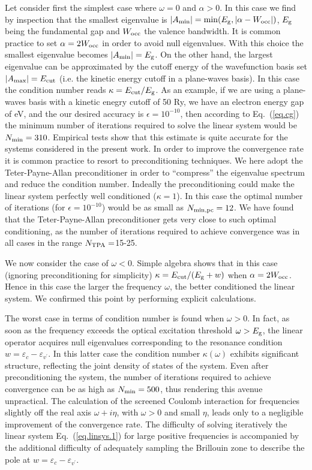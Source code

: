 \documentclass[twocolumn,prb,showpacs,superscriptaddress]{revtex4}
\def\w{\omega}
\def\E{\varepsilon}
\def\vp{{v^\prime}}
\begin{document}
Let consider first the simplest case where $\w=0$ and $\alpha>0$. In this case 
we find by inspection that the smallest eigenvalue is $|A_{\rm min}|= \min(E_{\rm g}, |\alpha-W_{\rm occ}|)$, 
$E_{\rm g}$ being the fundamental gap and $W_{\rm occ}$ the valence bandwidth.
It is common practice to set $\alpha=2W_{\rm occ}$ in order to avoid null eigenvalues.
\cite{baroni.rmp} With this choice the smallest eigenvalue becomes $|A_{\rm min}|=E_{\rm g}$.
On the other hand, the largest eigenvalue can be approximated by the
cutoff energy of the wavefunction basis set $|A_{\rm max}|=E_{\rm cut}$
(i.e. the kinetic energy cutoff in a plane-waves basis).
In this case the condition number reads $\kappa = E_{\rm cut}/E_{\rm g}$.
As an example, if we are using a plane-waves basis with a kinetic enegry
cutoff of 50 Ry, we have an electron energy gap of eV, 
and the our desired accuracy is $\epsilon=10^{-10}$, then according to
Eq.\ (\ref{eq.cg}) the minimum number of iterations required to solve 
the linear system would be $N_{\rm min} = 310$. Empirical tests show that 
this estimate is quite accurate for the systems considered in the present work.
In order to improve the convergence rate it is common practice to resort to preconditioning
techniques. We here adopt the Teter-Payne-Allan preconditioner\cite{tpa}
in order to ``compress'' the eigenvalue spectrum and reduce the
condition number. Indeally the preconditioning could make the linear
system perfectly well conditioned ($\kappa=1$). In this case
the optimal  number of iterations (for $\epsilon=10^{-10}$) would be as small
as $N_{\rm min,pc} = 12$. We have found that the Teter-Payne-Allan preconditioner
gets very close to such optimal conditioning, as the number of iterations
required to achieve convergence was in all cases in the range $N_{\rm TPA}=$15-25. 

We now consider the case of $\w<0$. Simple algebra shows that in this case
(ignoring preconditioning for simplicity) $\kappa = E_{\rm cut}/(E_{\rm g} + w)$
when $\alpha = 2W_{\rm occ}$. Hence in this case the larger the frequency $\w$,
the better conditioned the linear system. We confirmed this point
by performing explicit calculations.

The worst case in terms of condition number is found when $\w>0$. 
In fact, as soon as the frequency exceeds the optical excitation
threshold $\w>E_{\rm g}$, the linear operator acquires null eigenvalues 
corresponding to the resonance condition $w = \E_c - \E_\vp$. 
In this latter case the condition
number $\kappa(\w)$ exhibits significant structure, reflecting
the joint density of states of the system. Even after preconditioning the system, 
the number of iterations required to achieve convergence can be as high as 
$N_{\rm min} = 500$, thus rendering this avenue unpractical.
The calculation of the screened Coulomb interaction for frequencies slightly
off the real axis $\w+i\eta$, with $\w>0$ and small $\eta$, leads only to a negligible
improvement of the convergence rate.
The difficulty of solving iteratively the linear system Eq.\ (\ref{eq.linsys.1})
for large positive frequencies is accompanied by the additional difficulty 
of adequately sampling the Brillouin zone to describe the pole at $w = \E_c - \E_\vp$.
\end{document}
